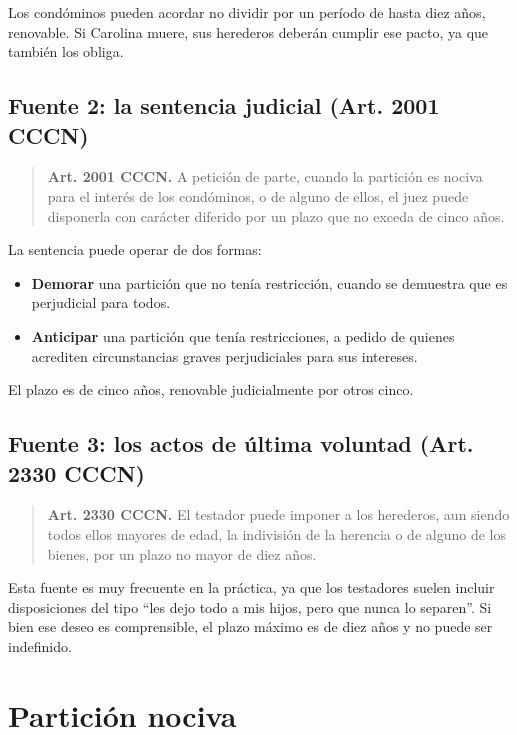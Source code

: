 \documentclass[12pt,oneside]{book}
\begin{document}
Los condóminos pueden acordar no dividir por un período de hasta diez años, renovable. Si Carolina muere, sus herederos deberán cumplir ese pacto, ya que también los obliga.

\subsection{Fuente 2: la sentencia judicial (Art. 2001 CCCN)}

\begin{quote}
\textbf{Art. 2001 CCCN.} A petición de parte, cuando la partición es nociva para el interés de los condóminos, o de alguno de ellos, el juez puede disponerla con carácter diferido por un plazo que no exceda de cinco años.
\end{quote}

La sentencia puede operar de dos formas:

\begin{itemize}
    \item \textbf{Demorar} una partición que no tenía restricción, cuando se demuestra que es perjudicial para todos.
    \item \textbf{Anticipar} una partición que tenía restricciones, a pedido de quienes acrediten circunstancias graves perjudiciales para sus intereses.
\end{itemize}

El plazo es de cinco años, renovable judicialmente por otros cinco.

\subsection{Fuente 3: los actos de última voluntad (Art. 2330 CCCN)}

\begin{quote}
\textbf{Art. 2330 CCCN.} El testador puede imponer a los herederos, aun siendo todos ellos mayores de edad, la indivisión de la herencia o de alguno de los bienes, por un plazo no mayor de diez años.
\end{quote}

Esta fuente es muy frecuente en la práctica, ya que los testadores suelen incluir disposiciones del tipo ``les dejo todo a mis hijos, pero que nunca lo separen''. Si bien ese deseo es comprensible, el plazo máximo es de diez años y no puede ser indefinido.

\section{Partición nociva}
\end{document}
